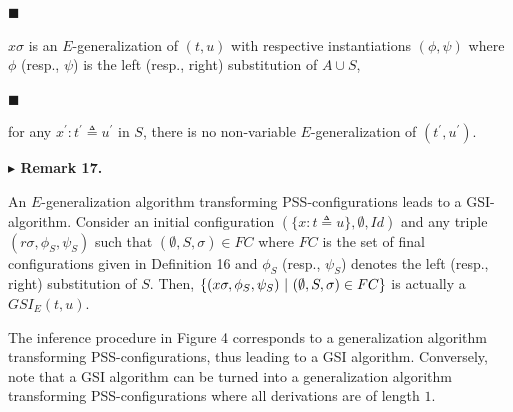 \par\noindent  $\blacksquare$ 
 
$x\sigma$ is an $E$-generalization of $(t,u)$ with respective instantiations $(\phi,\psi)$ where $\phi$ (resp., $\psi$) is the left (resp., right) substitution of $A\cup S$,\par
 
 
 
\par\noindent  $\blacksquare$ 
 
for any $x^{\prime}:t^{\prime}\triangleq u^{\prime}$ in $S$, there is no non-variable $E$-generalization of $(t^{\prime},u^{\prime})$.\par
 
 
  
 
 
 
\par\medskip\noindent\textbf{$\blacktriangleright$ Remark 17.}\par
 
 
An $E$-generalization algorithm transforming PSS-configurations leads to a GSI-algorithm. Consider an initial configuration $(\{x:t\triangleq u\},\emptyset,\mathit{Id})$ and any triple $(r\sigma,\phi_{S},\psi_{S})$ such that $(\emptyset,S,\sigma)\in FC$ where $FC$ is the set of final configurations given in Definition 16 and $\phi_{S}$ (resp., $\psi_{S}$) denotes the left (resp., right) substitution of $S$. Then, $\{(x\sigma,\phi_{S},\psi_{S})\leavevmode\nobreak\ |\leavevmode\nobreak\ (\emptyset,S,\sigma)\in FC\}$ is actually a $GSI_{E}(t,u)$.\par
 
 
 
The inference procedure in Figure 4 corresponds to a generalization algorithm transforming PSS-configurations, thus leading to a GSI algorithm. Conversely, note that a GSI algorithm can be turned into a generalization algorithm transforming PSS-configurations where all derivations are of length $1$.\par
 
 
 
 
